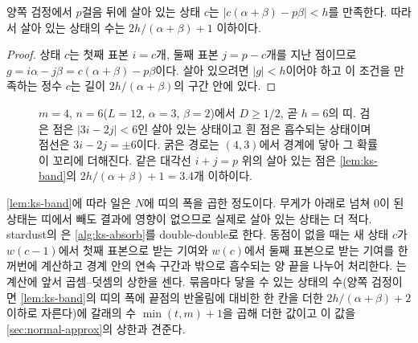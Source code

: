 \begin{lemma}
\label{lem:ks-band}
양쪽 검정에서 $p$걸음 뒤에 살아 있는 상태 $c$는 $|c(\alpha+\beta)-p\beta|<h$를 만족한다. 따라서 살아 있는 상태의 수는 $2h/(\alpha+\beta)+1$ 이하이다.
\end{lemma}

\begin{proof}
상태 $c$는 첫째 표본 $i=c$개, 둘째 표본 $j=p-c$개를 지난 점이므로 $g=i\alpha-j\beta=c(\alpha+\beta)-p\beta$이다. 살아 있으려면 $|g|<h$이어야 하고 이 조건을 만족하는 정수 $c$는 길이 $2h/(\alpha+\beta)$의 구간 안에 있다.
\end{proof}

\begin{figure}[htbp]
\centering
{}
\caption{$m=4$, $n=6$($L=12$, $\alpha=3$, $\beta=2$)에서 $D\ge1/2$, 곧 $h=6$의 띠. 검은 점은 $|3i-2j|<6$인 살아 있는 상태이고 흰 점은 흡수되는 상태이며 점선은 $3i-2j=\pm6$이다. 굵은 경로는 $(4,3)$에서 경계에 닿아 그 확률이 꼬리에 더해진다. 같은 대각선 $i+j=p$ 위의 살아 있는 점은 \cref{lem:ks-band}의 $2h/(\alpha+\beta)+1=3.4$개 이하이다.}
\label{fig:ks-band}
\end{figure}

\cref{lem:ks-band}에 따라 일은 $N$에 띠의 폭을 곱한 정도이다. 무게가 아래로 넘쳐 $0$이 된 상태는 띠에서 빼도 결과에 영향이 없으므로 실제로 살아 있는 상태는 더 적다. stardust의 은 \cref{alg:ks-absorb}를 double-double로 한다. 동점이 없을 때는 새 상태 $c$가 $w(c-1)$에서 첫째 표본으로 받는 기여와 $w(c)$에서 둘째 표본으로 받는 기여를 한꺼번에 계산하고 경계 안의 연속 구간과 밖으로 흡수되는 양 끝을 나누어 처리한다. 는 계산에 앞서 곱셈--덧셈의 상한을 센다. 묶음마다 닿을 수 있는 상태의 수(양쪽 검정이면 \cref{lem:ks-band}의 띠의 폭에 끝점의 반올림에 대비한 한 칸을 더한 $2h/(\alpha+\beta)+2$ 이하로 자른다)에 갈래의 수 $\min(t,m)+1$을 곱해 더한 값이고 이 값을 \cref{sec:normal-approx}의 상한과 견준다.


